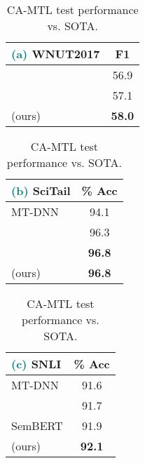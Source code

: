 \documentclass{article} \usepackage{iclr2021_conference,times}
\begin{document}
\begin{table}[h]
    \caption{\small CA-MTL test performance vs. SOTA.}
    \begin{subtable}[h]{0.3\textwidth}
        \centering
        \footnotesize
        \setlength{\tabcolsep}{2pt}
        \begin{tabular}{|l|c|}
        	\hline 
        		\textcolor{teal}{\textbf{(a)}} \textbf{WNUT2017} & F1 \\
        		\hline
         & 56.9 \\
                           & 57.1 \\
                \hline
                 (ours)  & \textbf{58.0} \\
            \hline
        \end{tabular}
    \end{subtable}
    \hfill
    \begin{subtable}[h]{0.3\textwidth}
        \centering
        \footnotesize
        \setlength{\tabcolsep}{2pt}
        \begin{tabular}{|l|c|}
    	\hline
    	    \textcolor{teal}{\textbf{(b)}} \textbf{SciTail} & \% Acc \\
    	    \hline
             MT-DNN                                & 94.1           \\
        & 96.3           \\
              &\textbf{96.8}   \\
        \hline
             (ours)     &\textbf{96.8}   \\
        \hline
    \end{tabular}

     \end{subtable}
     \hfill
    \begin{subtable}[h]{0.3\textwidth}
        \centering
        \footnotesize
        \setlength{\tabcolsep}{2pt}
        \begin{tabular}{|l|c|}
    	\hline 
        	\textcolor{teal}{\textbf{(c)}} \textbf{SNLI} & \% Acc \\
        	\hline
    		MT-DNN                                & 91.6 \\
                    & 91.7 \\
            SemBERT                               & 91.9 \\
            \hline
             (ours)     & \textbf{92.1} \\
        \hline
    \end{tabular}
     \end{subtable}
     
     \label{table:ner_scitail_snli}
\end{table}
\end{document}
